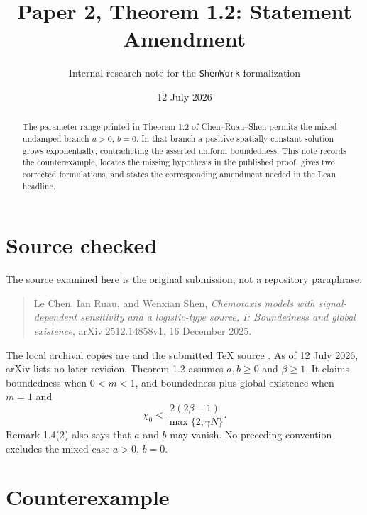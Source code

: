 \documentclass[11pt]{article}
\title{Paper 2, Theorem 1.2: Statement Amendment}
\author{Internal research note for the \texttt{ShenWork} formalization}
\date{12 July 2026}
\begin{document}
\maketitle

\begin{abstract}
The parameter range printed in Theorem 1.2 of Chen--Ruau--Shen permits the
mixed undamped branch $a>0$, $b=0$.  In that branch a positive spatially
constant solution grows exponentially, contradicting the asserted uniform
boundedness.  This note records the counterexample, locates the missing
hypothesis in the published proof, gives two corrected formulations, and
states the corresponding amendment needed in the Lean headline.
\end{abstract}

\section{Source checked}

The source examined here is the original submission, not a repository
paraphrase:

\begin{quote}
Le Chen, Ian Ruau, and Wenxian Shen, \emph{Chemotaxis models with
signal-dependent sensitivity and a logistic-type source, I: Boundedness and
global existence}, arXiv:2512.14858v1, 16 December 2025.
\end{quote}

The local archival copies are  and the submitted TeX source
.  As of 12 July 2026, arXiv lists no later
revision.  Theorem 1.2 assumes
$a,b\geq 0$ and $\beta\geq 1$.  It claims boundedness when $0<m<1$, and
boundedness plus global existence when $m=1$ and
\begin{equation}
  \chi_0 < \frac{2(2\beta-1)}{\max\{2,\gamma N\}}.
  \label{eq:chi-threshold}
\end{equation}
Remark 1.4(2) also says that $a$ and $b$ may vanish.  No preceding convention
excludes the mixed case $a>0$, $b=0$.

\section{Counterexample}
\end{document}
